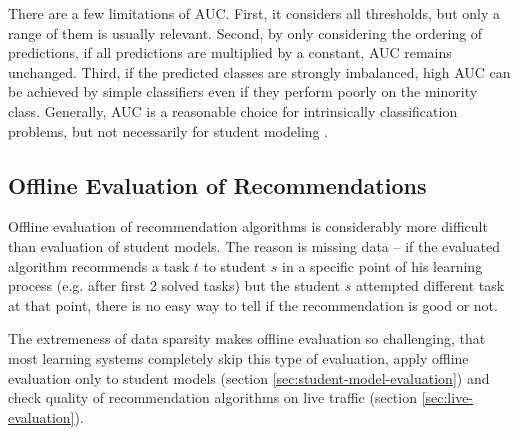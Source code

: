 There are a few limitations of AUC.
First, it considers all thresholds, but only a range of them is usually relevant.
Second, by only considering the ordering of predictions,
  if all predictions are multiplied by a constant, AUC remains unchanged.
Third, if the predicted classes are strongly imbalanced,
  high AUC can be achieved by simple classifiers
  even if they perform poorly on the minority class.
Generally, AUC is a reasonable choice for intrinsically classification problems,
  but not necessarily for student modeling \cite{pelanek-evaluation-student-models}.


\subsection{Offline Evaluation of Recommendations}


Offline evaluation of recommendation algorithms is considerably more difficult
  than evaluation of student models.
The reason is missing data --
  if the evaluated algorithm recommends a task $t$ to student $s$
  in a specific point of his learning process (e.g. after first 2 solved tasks)
  but the student $s$ attempted different task at that point,
  there is no easy way to tell if the recommendation is good or not.

The extremeness of data sparsity makes offline evaluation so challenging,
that most learning systems completely skip this type of evaluation,
apply offline evaluation only to student models
(section \ref{sec:student-model-evaluation})
and check quality of recommendation algorithms on live traffic
(section \ref{sec:live-evaluation}).


